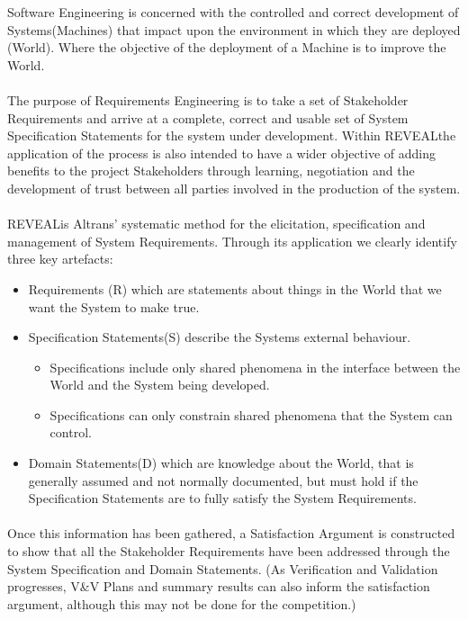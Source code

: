 \label{Introduction}
Software Engineering is concerned with the controlled and correct development of Systems(Machines) that impact upon the environment in which they are deployed (World). Where the objective of the deployment of a Machine is to improve the World.
 
\paragraph{}The purpose of Requirements Engineering is to take a set of Stakeholder Requirements and arrive at a complete, correct and usable set of System Specification Statements for the system under development. Within REVEAL\texttrademark the application of the process is also intended to have a wider objective of adding benefits to the project Stakeholders through learning, negotiation and the development of trust between all parties involved in the production of the system.

\paragraph{}REVEAL\texttrademark is Altrans' systematic method for the elicitation, specification and management of System Requirements. Through its application we clearly identify three key artefacts:

	\begin{itemize}
           \item Requirements (R) which are statements about things in the World that we want the System to make true.
           \item Specification Statements(S) describe the Systems external behaviour. 
   	   \begin{itemize}
             \item Specifications include only shared phenomena in the interface between the World and the System being developed.
             \item Specifications can only constrain shared phenomena that the System can control.
           \end{itemize}
           \item Domain Statements(D) which are knowledge about the World, that is generally assumed and not normally documented, but must hold if the Specification Statements are to fully satisfy the System Requirements.
         \end{itemize}

\paragraph{}Once this information has been gathered, a Satisfaction Argument is constructed to show that all the Stakeholder Requirements have been addressed through the System Specification and Domain Statements. (As Verification and Validation progresses, V\&V Plans and summary results can also inform the satisfaction argument, although this may not be done for the competition.) 

